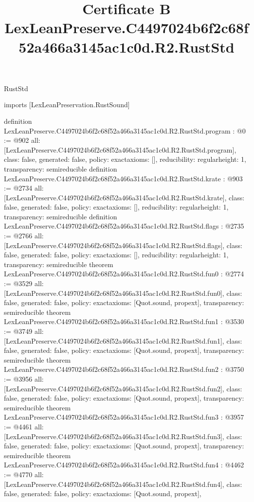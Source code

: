 \begin{lexlean}{RustStd}
\title{Certificate B LexLeanPreserve.C4497024b6f2c68f52a466a3145ac1c0d.R2.RustStd}
\begin{coremodule}
imports [LexLeanPreservation.RustSound]

definition LexLeanPreserve.C4497024b6f2c68f52a466a3145ac1c0d.R2.RustStd.program : @0 := @902 {
  all: [LexLeanPreserve.C4497024b6f2c68f52a466a3145ac1c0d.R2.RustStd.program],
  class: false,
  generated: false,
  policy: exact{axioms: []},
  reducibility: regular{height: 1},
  transparency: semireducible
}
definition LexLeanPreserve.C4497024b6f2c68f52a466a3145ac1c0d.R2.RustStd.krate : @903 := @2734 {
  all: [LexLeanPreserve.C4497024b6f2c68f52a466a3145ac1c0d.R2.RustStd.krate],
  class: false,
  generated: false,
  policy: exact{axioms: []},
  reducibility: regular{height: 1},
  transparency: semireducible
}
definition LexLeanPreserve.C4497024b6f2c68f52a466a3145ac1c0d.R2.RustStd.flags : @2735 := @2766 {
  all: [LexLeanPreserve.C4497024b6f2c68f52a466a3145ac1c0d.R2.RustStd.flags],
  class: false,
  generated: false,
  policy: exact{axioms: []},
  reducibility: regular{height: 1},
  transparency: semireducible
}
theorem LexLeanPreserve.C4497024b6f2c68f52a466a3145ac1c0d.R2.RustStd.fun0 : @2774 := @3529 {
  all: [LexLeanPreserve.C4497024b6f2c68f52a466a3145ac1c0d.R2.RustStd.fun0],
  class: false,
  generated: false,
  policy: exact{axioms: [Quot.sound, propext]},
  transparency: semireducible
}
theorem LexLeanPreserve.C4497024b6f2c68f52a466a3145ac1c0d.R2.RustStd.fun1 : @3530 := @3749 {
  all: [LexLeanPreserve.C4497024b6f2c68f52a466a3145ac1c0d.R2.RustStd.fun1],
  class: false,
  generated: false,
  policy: exact{axioms: [Quot.sound, propext]},
  transparency: semireducible
}
theorem LexLeanPreserve.C4497024b6f2c68f52a466a3145ac1c0d.R2.RustStd.fun2 : @3750 := @3956 {
  all: [LexLeanPreserve.C4497024b6f2c68f52a466a3145ac1c0d.R2.RustStd.fun2],
  class: false,
  generated: false,
  policy: exact{axioms: [Quot.sound, propext]},
  transparency: semireducible
}
theorem LexLeanPreserve.C4497024b6f2c68f52a466a3145ac1c0d.R2.RustStd.fun3 : @3957 := @4461 {
  all: [LexLeanPreserve.C4497024b6f2c68f52a466a3145ac1c0d.R2.RustStd.fun3],
  class: false,
  generated: false,
  policy: exact{axioms: [Quot.sound, propext]},
  transparency: semireducible
}
theorem LexLeanPreserve.C4497024b6f2c68f52a466a3145ac1c0d.R2.RustStd.fun4 : @4462 := @4770 {
  all: [LexLeanPreserve.C4497024b6f2c68f52a466a3145ac1c0d.R2.RustStd.fun4],
  class: false,
  generated: false,
  policy: exact{axioms: [Quot.sound, propext]},
}
\end{coremodule}
\end{lexlean}
